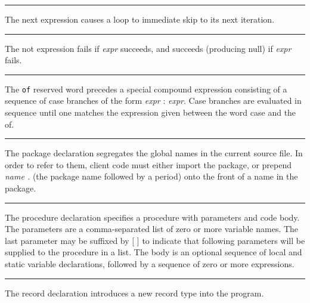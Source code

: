 \bigskip\hrule\vspace{0.1cm}

\noindent
{}The \textsf{next} expression causes a loop to
immediate skip to its next iteration.

\bigskip\hrule\vspace{0.1cm}

\noindent
{}The \textsf{not} expression fails if \textit{expr} succeeds,
and succeeds (producing null) if \textit{expr} fails.

\bigskip\hrule\vspace{0.1cm}

\noindent
{}The \texttt{of} reserved word precedes a special compound
expression consisting of a sequence of case branches of the form
\textit{expr} : \textit{expr}. Case branches are evaluated in sequence
until one matches the expression given between the word
\textsf{case} and the \textsf{of}.

\bigskip\hrule\vspace{0.1cm}

\noindent
{}The \textsf{package} declaration segregates the global
names in the current source file. In order to refer to them, client
code must either import the package, or prepend \textsf{\textit{name
.}} (the package name followed by a period) onto the front of a name in
the package.

\bigskip\hrule\vspace{0.1cm}

\noindent
{}The \textsf{procedure} declaration specifies a
procedure with parameters and code body. The parameters
are a comma-separated list of zero or more variable names. The last
parameter may be suffixed by [ ] to indicate that
following parameters will be supplied to the procedure in a list. The
body is an optional sequence of local and static variable declarations,
followed by a sequence of zero or more expressions.

\bigskip\hrule\vspace{0.1cm}

\noindent
{}The \textsf{record} declaration introduces a new record
type into the program.

